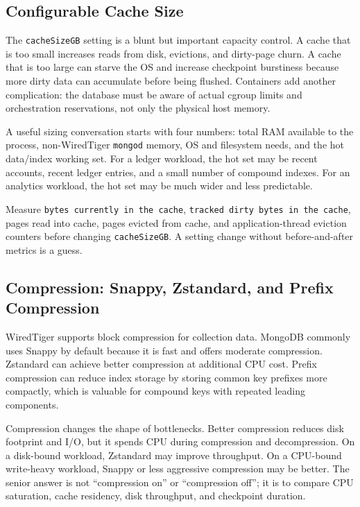 \subsection{Configurable Cache Size}
The \texttt{cacheSizeGB} setting is a blunt but important capacity control. A cache that is too small increases reads from disk, evictions, and dirty-page churn. A cache that is too large can starve the OS and increase checkpoint burstiness because more dirty data can accumulate before being flushed. Containers add another complication: the database must be aware of actual cgroup limits and orchestration reservations, not only the physical host memory.

A useful sizing conversation starts with four numbers: total RAM available to the process, non-WiredTiger \texttt{mongod} memory, OS and filesystem needs, and the hot data/index working set. For a ledger workload, the hot set may be recent accounts, recent ledger entries, and a small number of compound indexes. For an analytics workload, the hot set may be much wider and less predictable.

\begin{tipbox}
Measure \texttt{bytes currently in the cache}, \texttt{tracked dirty bytes in the cache}, pages read into cache, pages evicted from cache, and application-thread eviction counters before changing \texttt{cacheSizeGB}. A setting change without before-and-after metrics is a guess.
\end{tipbox}

\subsection{Compression: Snappy, Zstandard, and Prefix Compression}
WiredTiger supports block compression for collection data. MongoDB commonly uses Snappy by default because it is fast and offers moderate compression. Zstandard can achieve better compression at additional CPU cost. Prefix compression can reduce index storage by storing common key prefixes more compactly, which is valuable for compound keys with repeated leading components.

Compression changes the shape of bottlenecks. Better compression reduces disk footprint and I/O, but it spends CPU during compression and decompression. On a disk-bound workload, Zstandard may improve throughput. On a CPU-bound write-heavy workload, Snappy or less aggressive compression may be better. The senior answer is not ``compression on'' or ``compression off''; it is to compare CPU saturation, cache residency, disk throughput, and checkpoint duration.


